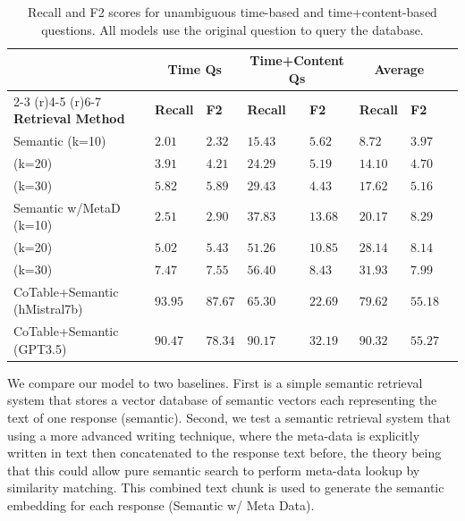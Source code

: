 \documentclass{article}
\begin{document}
\begin{table}
  \label{sample-table}
  \centering
  \begin{tabular}{llllllll}
    \toprule
    & \multicolumn{2}{c}{\textbf{Time Qs}}  & \multicolumn{2}{c}{\textbf{Time+Content Qs}} & \multicolumn{2}{c}{\textbf{Average}}\\
    \cmidrule(r){2-3}
    \cmidrule(r){4-5}
    \cmidrule(r){6-7}
    \textbf{Retrieval Method} & \textbf{Recall} & \textbf{F2} & \textbf{Recall} & \textbf{F2} & \textbf{Recall} & \textbf{F2}\\
    \midrule
    Semantic \text{\hspace{40pt}}(k=10) & $2.01$  & $2.32$  & $15.43$  & $5.62$  & $8.72$  & $3.97$ \\
    \text{\hspace{80pt}}(k=20) & $3.91$  & $4.21$  & $24.29$  & $5.19$  & $14.10$  & $4.70$ \\
    \text{\hspace{80pt}}(k=30) & $5.82$  & $5.89$  & $29.43$  & $4.43$  & $17.62$  & $5.16$ \\
    \midrule
    Semantic w/MetaD (k=10)  & $2.51$  & $2.90$   & $37.83$ & $13.68$  & $20.17$ & $8.29$\\
    \text{\hspace{80pt}}(k=20) & $5.02$  & $5.43$  & $51.26$  & $10.85$  & $28.14$  & $8.14$ \\
    \text{\hspace{80pt}}(k=30) & $7.47$  & $7.55$  & $56.40$  & $8.43$  & $31.93$  & $7.99$ \\
    \midrule
    CoTable+Semantic (hMistral7b) & $93.95$  & $87.67$  & $65.30$  & $22.69$   & $79.62$  & $55.18$ \\
    CoTable+Semantic (GPT3.5) & $90.47$  & $78.34$  & $90.17$  & $32.19$   & $90.32$ & $55.27$ \\
    \bottomrule
  \end{tabular}
  \caption{Recall and F2 scores for unambiguous time-based and time+content-based questions. All models use the original question to query the database.}\label{tab:main}
\end{table}

We compare our model to two baselines. First is a simple semantic retrieval system that stores a vector database of semantic vectors each representing the text of one response (semantic). Second, we test a semantic retrieval system that using a more advanced writing technique, where the meta-data is explicitly written in text then concatenated to the response text before, the theory being that this could allow pure semantic search to perform meta-data lookup by similarity matching. This combined text chunk is used to generate the semantic embedding for each response (Semantic w/ Meta Data).
\end{document}
